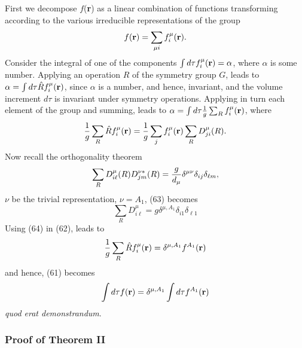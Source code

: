 First we decompose $f$({\bf r}) as a linear combination of functions 
transforming according to the various irreducible representations of 
the group
\begin{equation}
f( {\bf r} ) = \sum_{\mu i} f^{\mu}_i ( {\bf r} ).
\end{equation}
Consider the integral of one of the components
$\int d \tau f^{\mu}_i ( {\bf r} ) = \alpha$,
where $\alpha$ is some number.  Applying an operation ${\hat{R}}$ of 
the symmetry group $G$, leads to
$\alpha = \int d \tau {\hat{R}} f^{\mu}_i ( {\bf r} )$,
since $\alpha$ is a number, and hence, invariant, and the volume 
increment $d \tau$ is invariant under symmetry operations.  Applying 
in turn each element of the group and summing, leads to
$\alpha = \int d \tau {1 \over g} \sum_{R} f^{\mu}_i ( {\bf r} )$,
where
\begin{equation}
{1 \over g} \sum_{R} {\hat{R}} f^{\mu}_i ( {\bf r} ) = {1 \over g} 
\sum_{j} f^{\mu}_i ( {\bf r} ) \sum_{R} D^{\mu}_{ji} (R).
\label{chap16-eqno62}
\end{equation}
Now recall the orthogonality theorem
\begin{equation}
\sum_{R} D^{\mu}_{i\ell} (R) D^{\nu*}_{jm} (R) = {g \over d_{\mu}} 
\delta^{\mu \nu} \delta_{ij} \delta_{\ell m},
\label{chap16-eqno63}
\end{equation}
 $\nu$ be the trivial representation, $\nu = A_1$, (63) becomes
\begin{equation}
\sum_{R} D^{\mu}_{i \ell} = g \delta^{\mu , A_1} \delta_{i1} 
\delta_{\ell 1}
\label{chap16-eqno64}
\end{equation}
Using (64) in (62), leads to
\begin{equation}
{1 \over g} \sum_{R} {\hat{R}} f^{\mu}_i ( {\bf r} ) = \delta^{\mu , 
A_1} f^{A_1} ( {\bf r} )
\end{equation}
and hence, (61) becomes
\begin{equation}
\int d \tau f ( {\bf r} ) = \delta^{\mu , A_1} \int d \tau 
f^{A_1} ( {\bf r} )
\end{equation}
{\it quod erat demonstrandum}.

\subsubsection{Proof of Theorem II}

